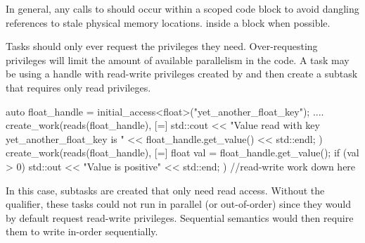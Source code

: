 In general, any calls to  should occur 
within a scoped code block to avoid dangling references to stale physical memory locations.
inside a  block when possible.

Tasks should only ever request the privileges they need. 
Over-requesting privileges will limit the amount of available parallelism in the code.
A task may be using a handle with read-write privileges created by 
and then create a subtask that requires only read privileges.


\begin{CppCode}
auto float_handle = initial_access<float>("yet_another_float_key");
....
create_work(reads(float_handle), [=] {
  std::cout << "Value read with key yet_another_float_key is " 
          << float_handle.get_value() << std::endl;
})
create_work(reads(float_handle), [=] {
  float val = float_handle.get_value();
  if (val > 0) std::out << "Value is positive" << std::end;
})
//read-write work down here
\end{CppCode}
In this case, subtasks are created that only need read access. 
Without the  qualifier, these tasks could not run in parallel (or out-of-order) since they
would by default request read-write privileges.
Sequential semantics would then require them to write in-order sequentially.

